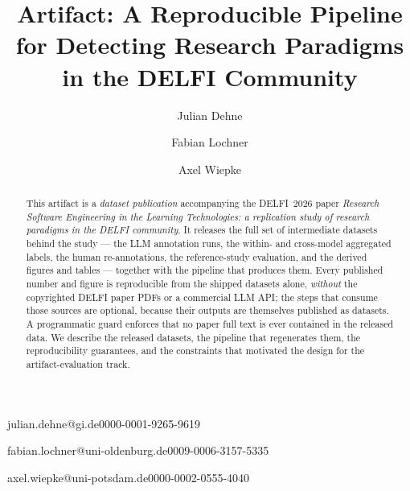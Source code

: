 \documentclass[english,biblatex]{lni}
\begin{document}
\title[RSE in the DELFI Community --- Artifact]{%
Artifact: A Reproducible Pipeline for Detecting Research Paradigms in the DELFI Community}


\author[1]{Julian Dehne}{julian.dehne@gi.de}{0000-0001-9265-9619}
\author[2]{Fabian Lochner}{fabian.lochner@uni-oldenburg.de}{0009-0006-3157-5335}
\author[3]{Axel Wiepke}{axel.wiepke@uni-potsdam.de}{0000-0002-0555-4040}



\maketitle

\begin{abstract}
This artifact is a \emph{dataset publication} accompanying the DELFI~2026 paper
\emph{Research Software Engineering in the Learning Technologies: a replication
study of research paradigms in the DELFI community}. It releases the full set of
intermediate datasets behind the study --- the LLM annotation runs, the within-
and cross-model aggregated labels, the human re-annotations, the reference-study
evaluation, and the derived figures and tables --- together with the pipeline that
produces them. Every published number and figure is reproducible from the shipped
datasets alone, \emph{without} the copyrighted DELFI paper PDFs or a commercial
LLM API; the steps that consume those sources are optional, because their outputs
are themselves published as datasets. A programmatic guard enforces that no paper
full text is ever contained in the released data. We describe the released
datasets, the pipeline that regenerates them, the reproducibility guarantees, and
the constraints that motivated the design for the artifact-evaluation track.
\end{abstract}
\end{document}
